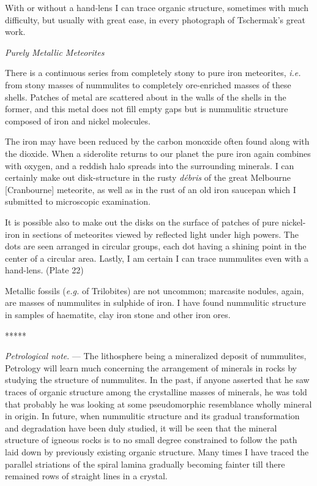\documentclass[a4paper, 12pt, oneside, landscape]{article}
\begin{document}
With or without a hand-lens I can trace organic structure, sometimes with much difficulty, but usually with great ease, in every photograph of Tschermak's great work.

\bigskip
\centerline{\emph{Purely Metallic Meteorites}}

There is a continuous series from completely stony to pure iron meteorites, \emph{i.e.} from stony masses of nummulites to completely ore-enriched masses of these shells. Patches of metal are scattered about in the walls of the shells in the former, and this metal does not fill empty gaps but is nummulitic structure composed of iron and nickel molecules.

The iron may have been reduced by the carbon monoxide often found along with the dioxide. When a siderolite returns to our planet the pure iron again combines with oxygen, and a reddish halo spreads into the surrounding minerals. I can certainly make out disk-structure in the rusty \emph{débris} of the great Melbourne [Cranbourne] meteorite, as well as in the rust of an old iron saucepan which I submitted to microscopic examination.

It is possible also to make out the disks on the surface of patches of pure nickel-iron in sections of meteorites viewed by reflected light under high powers. The dots are seen arranged in circular groups, each dot having a shining point in the center of a circular area. Lastly, I am certain I can trace nummulites even with a hand-lens. (Plate 22)

Metallic fossils (\emph{e.g.} of Trilobites) are not uncommon; marcasite nodules, again, are masses of nummulites in sulphide of iron. I have found nummulitic structure in samples of haematite, clay iron stone and other iron ores.

\centerline{*\hspace{15mm}*\hspace{15mm}*\hspace{15mm}*\hspace{15mm}*}
\bigskip

\emph{Petrological note}. --- The lithosphere being a mineralized deposit of nummulites, Petrology will learn much concerning the arrangement of minerals in rocks by studying the structure of nummulites. In the past, if anyone asserted that he saw traces of organic structure among the crystalline masses of minerals, he was told that probably he was looking at some pseudomorphic resemblance wholly mineral in origin. In future, when nummulitic structure and its gradual transformation and degradation have been duly studied, it will be seen that the mineral structure of igneous rocks is to no small degree constrained to follow the path laid down by previously existing organic structure. Many times I have traced the parallel striations of the spiral lamina gradually becoming fainter till there remained rows of straight lines in a crystal.
\end{document}
